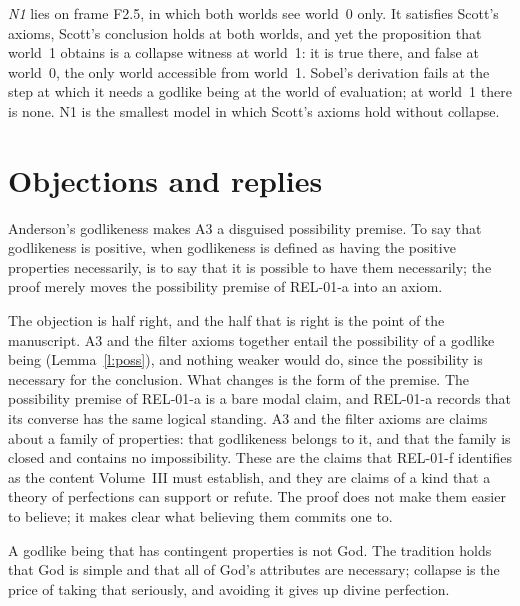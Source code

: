 \documentclass{situationist-preprint}
\begin{document}
\emph{N1} lies on frame F2.5, in which both worlds see world~0 only. It satisfies Scott's axioms, Scott's conclusion holds at both worlds, and yet the proposition that world~1 obtains is a collapse witness at world~1: it is true there, and false at world~0, the only world accessible from world~1. Sobel's derivation fails at the step at which it needs a godlike being at the world of evaluation; at world~1 there is none. N1 is the smallest model in which Scott's axioms hold without collapse.

\section{Objections and replies}\label{s:objections}

\begin{objection}
Anderson's godlikeness makes A3 a disguised possibility premise. To say that godlikeness is positive, when godlikeness is defined as having the positive properties necessarily, is to say that it is possible to have them necessarily; the proof merely moves the possibility premise of REL-01-a into an axiom.
\end{objection}

\begin{reply}
The objection is half right, and the half that is right is the point of the manuscript. A3 and the filter axioms together entail the possibility of a godlike being (Lemma~\ref{l:poss}), and nothing weaker would do, since the possibility is necessary for the conclusion. What changes is the form of the premise. The possibility premise of REL-01-a is a bare modal claim, and REL-01-a records that its converse has the same logical standing. A3 and the filter axioms are claims about a family of properties: that godlikeness belongs to it, and that the family is closed and contains no impossibility. These are the claims that REL-01-f identifies as the content Volume~III must establish, and they are claims of a kind that a theory of perfections can support or refute. The proof does not make them easier to believe; it makes clear what believing them commits one to.
\end{reply}

\begin{objection}
A godlike being that has contingent properties is not God. The tradition holds that God is simple and that all of God's attributes are necessary; collapse is the price of taking that seriously, and avoiding it gives up divine perfection.
\end{objection}
\end{document}
